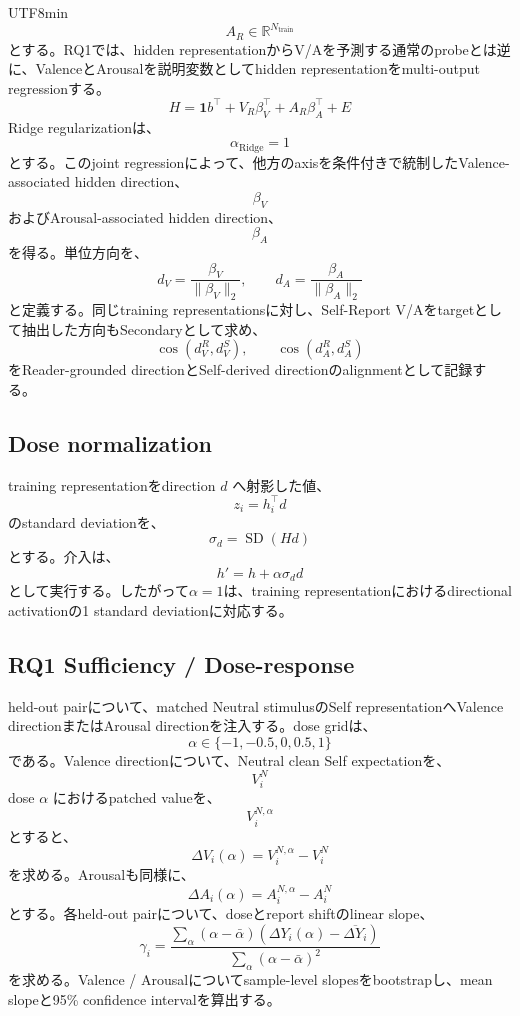 \documentclass{article} %
\begin{document}
\begin{CJK*}{UTF8}{min}
\[
A_R
\in
\mathbb{R}^{N_{\mathrm{train}}}
\]
とする。RQ1では、hidden representationからV/Aを予測する通常のprobeとは逆に、ValenceとArousalを説明変数としてhidden representationをmulti-output regressionする。
\[
H
=
\mathbf{1}b^\top
+
V_R\beta_V^\top
+
A_R\beta_A^\top
+
E
\]
Ridge regularizationは、
\[
\alpha_{\mathrm{Ridge}}=1
\]
とする。このjoint regressionによって、他方のaxisを条件付きで統制したValence-associated hidden direction、
\[
\beta_V
\]
およびArousal-associated hidden direction、
\[
\beta_A
\]
を得る。単位方向を、
\[
d_V = \frac{\beta_V}{\|\beta_V\|_2},
\qquad
d_A = \frac{\beta_A}{\|\beta_A\|_2}
\]
と定義する。同じtraining representationsに対し、Self-Report V/Aをtargetとして抽出した方向もSecondaryとして求め、
\[
\cos(d_V^{R},d_V^{S}),
\qquad
\cos(d_A^{R},d_A^{S})
\]
をReader-grounded directionとSelf-derived directionのalignmentとして記録する。


\subsection{Dose normalization}

training representationをdirection \(d\) へ射影した値、
\[
z_i
=
h_i^\top d
\]
のstandard deviationを、
\[
\sigma_d
=
\operatorname{SD}(Hd)
\]
とする。介入は、
\[
h'
=
h+\alpha\sigma_d d
\]
として実行する。したがって\(\alpha=1\)は、training representationにおけるdirectional activationの1 standard deviationに対応する。


\subsection{RQ1 Sufficiency / Dose-response}

held-out pairについて、matched Neutral stimulusのSelf representationへValence directionまたはArousal directionを注入する。dose gridは、
\[
\alpha
\in
\{
-1,-0.5,0,0.5,1
\}
\]
である。Valence directionについて、Neutral clean Self expectationを、
\[
V_i^{N}
\]
dose \(\alpha\) におけるpatched valueを、
\[
V_i^{N,\alpha}
\]
とすると、
\[
\Delta V_i(\alpha)
=
V_i^{N,\alpha}
-
V_i^{N}
\]
を求める。Arousalも同様に、
\[
\Delta A_i(\alpha)
=
A_i^{N,\alpha}
-
A_i^{N}
\]
とする。各held-out pairについて、doseとreport shiftのlinear slope、
\[
\gamma_i
=
\frac{
\sum_{\alpha}
(\alpha-\bar{\alpha})
(\Delta Y_i(\alpha)-\overline{\Delta Y_i})
}{
\sum_{\alpha}
(\alpha-\bar{\alpha})^2
}
\]
を求める。Valence / Arousalについてsample-level slopesをbootstrapし、mean slopeと95\% confidence intervalを算出する。



\end{CJK*}
\end{document}
